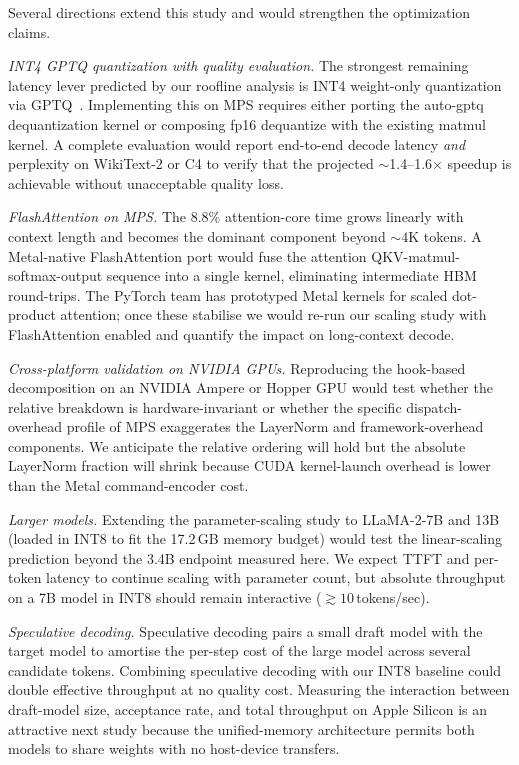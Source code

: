\documentclass[conference]{IEEEtran}
\begin{document}
Several directions extend this study and would strengthen the
optimization claims.

\textit{INT4 GPTQ quantization with quality evaluation.} The strongest
remaining latency lever predicted by our roofline analysis is INT4
weight-only quantization via GPTQ~\cite{frantar2022}. Implementing
this on MPS requires either porting the auto-gptq dequantization
kernel or composing fp16 dequantize with the existing matmul kernel.
A complete evaluation would report end-to-end decode latency
\emph{and} perplexity on WikiText-2 or C4 to verify that the
projected $\sim$1.4--1.6$\times$ speedup is achievable without
unacceptable quality loss.

\textit{FlashAttention on MPS.} The 8.8\% attention-core time grows
linearly with context length and becomes the dominant component
beyond ${\sim}4$K tokens. A Metal-native FlashAttention port would
fuse the attention QKV-matmul-softmax-output sequence into a single
kernel, eliminating intermediate HBM round-trips. The PyTorch team
has prototyped Metal kernels for scaled dot-product attention; once
these stabilise we would re-run our scaling study with FlashAttention
enabled and quantify the impact on long-context decode.

\textit{Cross-platform validation on NVIDIA GPUs.} Reproducing the
hook-based decomposition on an NVIDIA Ampere or Hopper GPU would test
whether the relative breakdown is hardware-invariant or whether the
specific dispatch-overhead profile of MPS exaggerates the
LayerNorm and framework-overhead components. We anticipate the
relative ordering will hold but the absolute LayerNorm fraction will
shrink because CUDA kernel-launch overhead is lower than the Metal
command-encoder cost.

\textit{Larger models.} Extending the parameter-scaling study to
LLaMA-2-7B and 13B (loaded in INT8 to fit the 17.2\,GB memory budget)
would test the linear-scaling prediction beyond the 3.4B endpoint
measured here. We expect TTFT and per-token latency to continue
scaling with parameter count, but absolute throughput on a 7B model
in INT8 should remain interactive (${\gtrsim}10$\,tokens/sec).

\textit{Speculative decoding.} Speculative decoding pairs a small
draft model with the target model to amortise the per-step cost of
the large model across several candidate tokens. Combining
speculative decoding with our INT8 baseline could double effective
throughput at no quality cost. Measuring the interaction between
draft-model size, acceptance rate, and total throughput on Apple
Silicon is an attractive next study because the unified-memory
architecture permits both models to share weights with no host-device
transfers.
\end{document}
